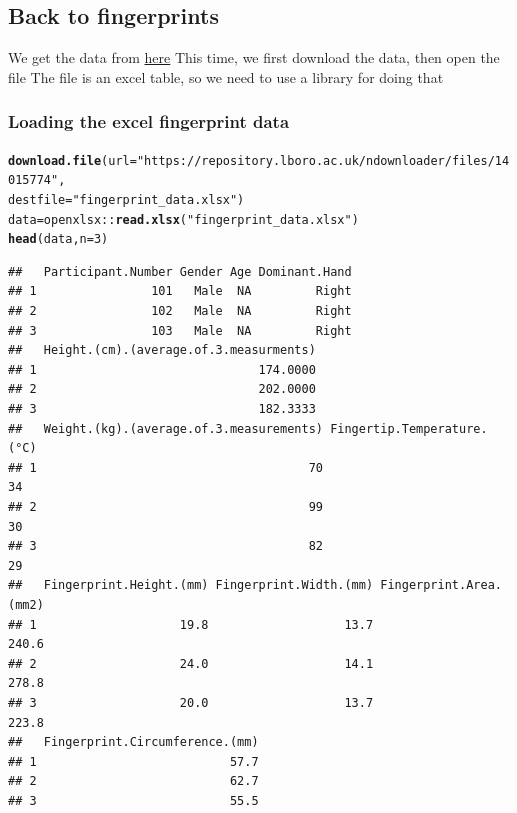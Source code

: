\documentclass[aspectratio=169]{beamer}\usepackage[]{graphicx}\usepackage[]{xcolor}
\makeatletter
\newcommand{\hlnum}[1]{\textcolor[rgb]{0.686,0.059,0.569}{#1}}%
\newcommand{\hlsng}[1]{\textcolor[rgb]{0.192,0.494,0.8}{#1}}%
\newcommand{\hlopt}[1]{\textcolor[rgb]{0,0,0}{#1}}%
\newcommand{\hldef}[1]{\textcolor[rgb]{0.345,0.345,0.345}{#1}}%
\newcommand{\hlkwb}[1]{\textcolor[rgb]{0.69,0.353,0.396}{#1}}%
\newcommand{\hlkwc}[1]{\textcolor[rgb]{0.333,0.667,0.333}{#1}}%
\newcommand{\hlkwd}[1]{\textcolor[rgb]{0.737,0.353,0.396}{\textbf{#1}}}%
\newenvironment{kframe}{%
 \def\at@end@of@kframe{}%
 \ifinner\ifhmode%
  \def\at@end@of@kframe{\end{minipage}}%
  \begin{minipage}{\columnwidth}%
 \fi\fi%
 \def\FrameCommand##1{\hskip\@totalleftmargin \hskip-\fboxsep
 \colorbox{shadecolor}{##1}\hskip-\fboxsep
     \hskip-\linewidth \hskip-\@totalleftmargin \hskip\columnwidth}%
 \MakeFramed {\advance\hsize-\width
   \@totalleftmargin\z@ \linewidth\hsize
   \@setminipage}}%
 {\par\unskip\endMakeFramed%
 \at@end@of@kframe}
\newenvironment{knitrout}{}{} %
\makeatother
\begin{document}
\subsection{Back to fingerprints}


\begin{frame}
We get the data from \href{https://repository.lboro.ac.uk/articles/dataset/Height_weight_and_fingerprint_measurements_collected_from_200_participants/7539206}{here}
\vfill
This time, we first download the data, then open the file
\vfill
The file is an excel table, so we need to use a library for doing that
\end{frame}


\begin{frame}[fragile]\frametitle{Loading the excel fingerprint data}
\begin{knitrout}
\color{fgcolor}\begin{kframe}
\begin{alltt}
\hlkwd{download.file}\hldef{(}\hlkwc{url} \hldef{=} \hlsng{"https://repository.lboro.ac.uk/ndownloader/files/14015774"}\hldef{,}
             \hlkwc{destfile} \hldef{=} \hlsng{"fingerprint_data.xlsx"}\hldef{)}
\hldef{data} \hlkwb{=} \hldef{openxlsx}\hlopt{::}\hlkwd{read.xlsx}\hldef{(}\hlsng{"fingerprint_data.xlsx"}\hldef{)}
\hlkwd{head}\hldef{(data,} \hlkwc{n}\hldef{=}\hlnum{3}\hldef{)}
\end{alltt}
\begin{verbatim}
##   Participant.Number Gender Age Dominant.Hand
## 1                101   Male  NA         Right
## 2                102   Male  NA         Right
## 3                103   Male  NA         Right
##   Height.(cm).(average.of.3.measurments)
## 1                               174.0000
## 2                               202.0000
## 3                               182.3333
##   Weight.(kg).(average.of.3.measurements) Fingertip.Temperature.(°C)
## 1                                      70                         34
## 2                                      99                         30
## 3                                      82                         29
##   Fingerprint.Height.(mm) Fingerprint.Width.(mm) Fingerprint.Area.(mm2)
## 1                    19.8                   13.7                  240.6
## 2                    24.0                   14.1                  278.8
## 3                    20.0                   13.7                  223.8
##   Fingerprint.Circumference.(mm)
## 1                           57.7
## 2                           62.7
## 3                           55.5
\end{verbatim}
\end{kframe}
\end{knitrout}
\end{frame}
\end{document}
